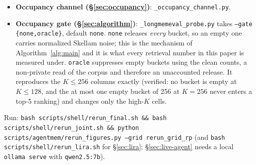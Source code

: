 \documentclass[pdflatex,sn-mathphys-num,12pt]{sn-jnl}
\theoremstyle{thmstyleone}%
\theoremstyle{thmstyletwo}%
\theoremstyle{thmstylethree}%
\newcommand{\secref}[1]{\S\ref{#1}}
\begin{document}
\begin{appendices}
\begin{itemize}
    \texttt{--proj pca} check of \secref{sec:robustness}. Each script has an additive \texttt{--json}
    dump; the crypto path is byte-identical to the released \texttt{privacy\_utils}.
  \item \textbf{Occupancy channel (\secref{sec:occupancy})}: \texttt{\_occupancy\_channel.py}.
  \item \textbf{Occupancy gate (\secref{sec:algorithm})}: \texttt{\_longmemeval\_probe.py} takes
    \texttt{--gate \{none,oracle\}}, default \texttt{none}. \texttt{none} releases \emph{every}
    bucket, so an empty one carries normalized Skellam noise; this is the mechanism of
    Algorithm~\ref{alg:main} and it is what every retrieval number in this paper is measured under.
    \texttt{oracle} suppresses empty buckets using the clean counts, a non-private read of the
    corpus and therefore an unaccounted release. It reproduces the $K \leq 256$ columns exactly
    (verified: no bucket is empty at $K \leq 128$, and the at most one empty bucket of 256 at
    $K = 256$ never enters a top-5 ranking) and changes only the high-$K$ cells.
\end{itemize}

Run: \texttt{bash scripts/shell/rerun\_final.sh \&\& bash scripts/shell/rerun\_joint.sh \&\& python
scripts/agentmem/rerun\_figures.py --grid rerun\_grid\_rp} (and \texttt{bash
scripts/shell/rerun\_lira.sh} for \secref{sec:lira}; \secref{sec:live-agent} needs a local
\texttt{ollama serve} with \texttt{qwen2.5:7b}).

\end{appendices}

\backmatter

\end{document}
